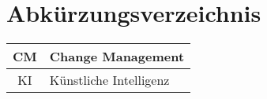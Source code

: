 \section*{Abkürzungsverzeichnis}

\begin{table}[h]
    \begin{tabular}{|c|m{15em}|}
        \hline
        CM & Change Management \\
        \hline
        KI & Künstliche Intelligenz \\
        \hline
    \end{tabular}
\end{table}